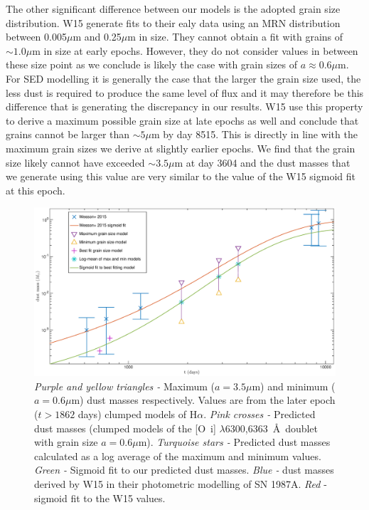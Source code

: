\documentclass[useAMS,usenatbib,usegraphicx]{mnras}
\begin{document}
The other significant difference between our models is the adopted grain 
size distribution.  W15 generate fits to their ealy data using an MRN 
distribution between 0.005$\mu$m and 0.25$\mu$m in size.  They cannot 
obtain a fit with grains of $\sim 1.0 \mu$m in size at early epochs.  
However, they do not consider values in between these size point as we 
conclude is likely the case with grain sizes of $a \approx 0.6\mu$m.  For 
SED modelling it is generally the case that the larger the grain size 
used, the less dust is required to produce the same level of flux and it 
may therefore be this difference that is generating the discrepancy in our 
results.  W15 use this property to derive a maximum possible grain size at 
late epochs as well and conclude that grains cannot be larger than $\sim 
5\mu$m by day 8515.  This is directly in line with the maximum grain sizes 
we derive at slightly earlier epochs.  We find that the grain size likely 
cannot have exceeded $\sim 3.5\mu$m at day 3604 and the dust masses that 
we generate using this value are very similar to the value of the W15 
sigmoid fit at this epoch.


\begin{figure}
\begin{center}
\includegraphics[trim =37 10 45 15,clip=true,scale=0.4]{Mdust_evol2}
\caption{\textit{Purple and yellow triangles -} Maximum ($a=3.5\mu$m) and 
minimum ($a=0.6\mu$m) dust masses respectively.  Values are from the 
later epoch ($t>1862$ days) clumped models of H$\alpha$.  \textit{Pink 
crosses - } Predicted dust masses (clumped models of the 
[O~{\sc i}] $\lambda$6300,6363~\AA\ doublet with grain size $a=0.6\mu$m).  
\textit{Turquoise stars -} Predicted dust masses calculated as a log 
average of the maximum and minimum values.  \textit{Green -} Sigmoid fit 
to our predicted dust masses. \textit{Blue - } dust masses derived by W15 
in their photometric modelling of SN 1987A. \textit{Red} - sigmoid fit to 
the W15 values.}
\label{Mdust}
\end{center}
\end{figure}
\end{document}
